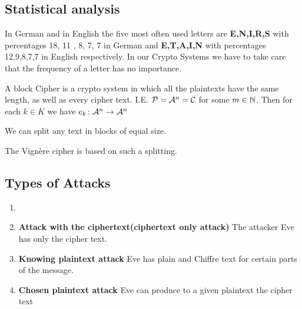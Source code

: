 \subsection{Statistical analysis}
In German and in English the five most often used letters are 
\textbf{E,N,I,R,S} with percentages 18, 11 , 8, 7, 7 in German and \textbf{E,T,A,I,N} with percentages
12,9,8,7,7 in English respectively.
In our Crypto Systems we have to take care that the frequency of a letter has no importance.
\begin{Def} 
A block Cipher is a crypto system in which all the plaintexts have the same length, as well as every cipher text. I.E. \(\mathcal{P}=\mathcal{A}^n=\mathcal{C}\) for some \(m\in \mathbb{N}\).
Then for each \(k\in K\) we have \(e_k\colon \mathcal{A}^n\to \mathcal{A}^n\)

\end{Def}
\begin{Bem}
We can split any text in blocks of equal size.
\end{Bem}
\begin{Bsp} The Vignère cipher is based on such a splitting.
\end{Bsp}
\subsection{Types of Attacks}
\begin{enumerate}
\item
\item \textbf{Attack with the ciphertext(ciphertext only attack)}
The attacker Eve has only the cipher text.
\item \textbf{Knowing plaintext attack}
Eve has plain and Chiffre text for certain parts of the message.
\item \textbf{Chosen plaintext attack}
Eve can produce to a given plaintext the cipher text
\end{enumerate}
\begin{Bsp}
\end{Bsp}
